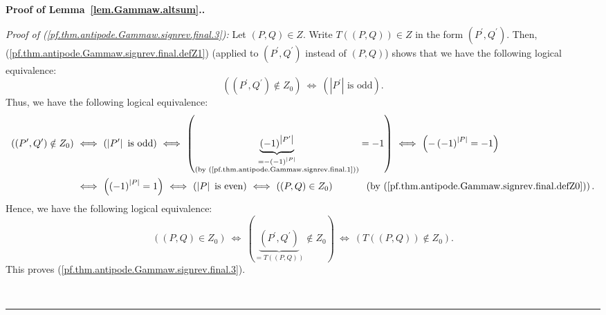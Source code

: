 \documentclass[numbers=enddot,12pt,final,onecolumn,notitlepage,abstracton]{scrartcl}
\theoremstyle{definition}
\newenvironment{proof}[1][Proof]{\noindent\textbf{#1.} }{\ \rule{0.5em}{0.5em}}
\newenvironment{verlong}{}{}
\begin{document}
\begin{proof}[Proof of Lemma~\ref{lem.Gammaw.altsum}.]
\begin{verlong}
{\textit{Proof of (\ref{pf.thm.antipode.Gammaw.signrev.final.3}):} Let $\left(
P,Q\right)  \in Z$. Write $T\left(  \left(  P,Q\right)  \right)  \in Z$ in the
form $\left(  P^{\prime},Q^{\prime}\right)  $. Then,
(\ref{pf.thm.antipode.Gammaw.signrev.final.defZ1}) (applied to $\left(
P^{\prime},Q^{\prime}\right)  $ instead of $\left(  P,Q\right)  $) shows that
we have the following logical equivalence:%
\[
\left(  \left(  P^{\prime},Q^{\prime}\right)  \notin Z_{0}\right)
\ \Longleftrightarrow\ \left(  \left\vert P^{\prime}\right\vert \text{ is
odd}\right)  .
\]
Thus, we have the following logical equivalence:%
\begin{align*}
\left(  \left(  P^{\prime},Q^{\prime}\right)  \notin Z_{0}\right)  \   &
\Longleftrightarrow\ \left(  \left\vert P^{\prime}\right\vert \text{ is
odd}\right)  \ \Longleftrightarrow\ \left(  \underbrace{\left(  -1\right)
^{\left\vert P^{\prime}\right\vert }}_{\substack{=-\left(  -1\right)
^{\left\vert P\right\vert }\\\text{(by
(\ref{pf.thm.antipode.Gammaw.signrev.final.1}))}}}=-1\right)
\ \Longleftrightarrow\ \left(  -\left(  -1\right)  ^{\left\vert P\right\vert
}=-1\right)  \\
& \Longleftrightarrow\ \left(  \left(  -1\right)  ^{\left\vert P\right\vert
}=1\right)  \ \Longleftrightarrow\ \left(  \left\vert P\right\vert \text{ is
even}\right)  \ \Longleftrightarrow\ \left(  \left(  P,Q\right)  \in
Z_{0}\right)  \ \ \ \ \ \ \ \ \ \ \left(  \text{by
(\ref{pf.thm.antipode.Gammaw.signrev.final.defZ0})}\right)  .
\end{align*}
Hence, we have the following logical equivalence:%
\[
\left(  \left(  P,Q\right)  \in Z_{0}\right)  \ \Longleftrightarrow\ \left(
\underbrace{\left(  P^{\prime},Q^{\prime}\right)  }_{=T\left(  \left(
P,Q\right)  \right)  }\notin Z_{0}\right)  \ \Longleftrightarrow\ \left(
T\left(  \left(  P,Q\right)  \right)  \notin Z_{0}\right)  .
\]
This proves (\ref{pf.thm.antipode.Gammaw.signrev.final.3}).

}
\end{verlong}
\end{proof}
\end{document}
